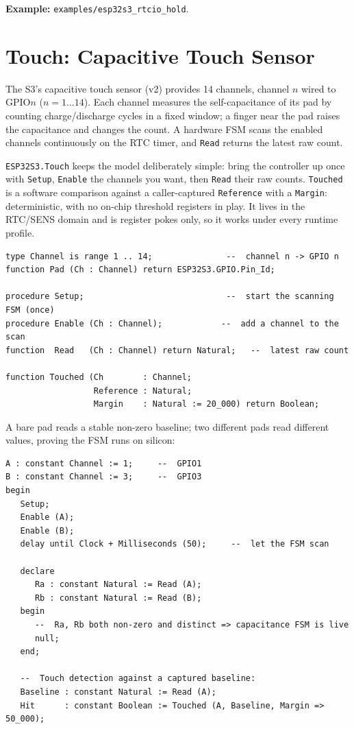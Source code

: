 \noindent\textbf{Example:} \texttt{examples/esp32s3\_rtcio\_hold}.

\section{Touch: Capacitive Touch Sensor}
\label{app:int:touch}

The S3's capacitive touch sensor (v2) provides 14 channels, channel $n$ wired to
GPIO$n$ ($n = 1\ldots14$). Each channel measures the self-capacitance of its pad
by counting charge/discharge cycles in a fixed window; a finger near the pad
raises the capacitance and changes the count. A hardware FSM scans the enabled
channels continuously on the RTC timer, and \texttt{Read} returns the latest raw
count.

\texttt{ESP32S3.Touch} keeps the model deliberately simple: bring the controller
up once with \texttt{Setup}, \texttt{Enable} the channels you want, then
\texttt{Read} their raw counts. \texttt{Touched} is a software comparison against a
caller-captured \texttt{Reference} with a \texttt{Margin}: deterministic, with
no on-chip threshold registers in play. It lives in the RTC/SENS domain and is
register pokes only, so it works under every runtime profile.

\begin{lstlisting}
type Channel is range 1 .. 14;               --  channel n -> GPIO n
function Pad (Ch : Channel) return ESP32S3.GPIO.Pin_Id;

procedure Setup;                             --  start the scanning FSM (once)
procedure Enable (Ch : Channel);            --  add a channel to the scan
function  Read   (Ch : Channel) return Natural;   --  latest raw count

function Touched (Ch        : Channel;
                  Reference : Natural;
                  Margin    : Natural := 20_000) return Boolean;
\end{lstlisting}

A bare pad reads a stable non-zero baseline; two different pads read different
values, proving the FSM runs on silicon:

\begin{lstlisting}
A : constant Channel := 1;     --  GPIO1
B : constant Channel := 3;     --  GPIO3
begin
   Setup;
   Enable (A);
   Enable (B);
   delay until Clock + Milliseconds (50);     --  let the FSM scan

   declare
      Ra : constant Natural := Read (A);
      Rb : constant Natural := Read (B);
   begin
      --  Ra, Rb both non-zero and distinct => capacitance FSM is live
      null;
   end;

   --  Touch detection against a captured baseline:
   Baseline : constant Natural := Read (A);
   Hit      : constant Boolean := Touched (A, Baseline, Margin => 50_000);
\end{lstlisting}

